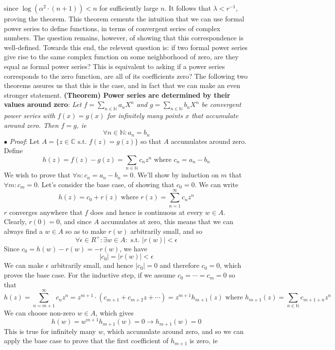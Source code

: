\documentclass{article}
\newcommand*{\tb}{\textbf}
\newcommand*{\ti}{\textit}
\newcommand*{\nn}{\newline \newline}
\newcommand*{\Pf}{\indent \ensuremath{\bullet} \textit{Proof}: }
\newcommand*{\N}{\mathbb{N}}
\newcommand*{\C}{\mathbb{C}}
\newcommand*{\st}{\text{ s.t. }}
\begin{document}
since $ \log(\alpha^2 \cdot (n + 1)) < n $ for sufficiently large $ n $. It follows that $ \lambda < r^{-1} $, proving the theorem. \qedsymbol
\nn
This theorem cements the intuition that we can use formal power series to define functions, in terms of convergent series of complex numbers. The question remains, however, of showing that this correspondence is well-defined. Towards this end, the relevent question is: if two formal power series give rise to the same complex function on some neighborhood of zero, are they equal as formal power series? This is equivalent to asking if a power series corresponds to the zero function, are all of its coefficients zero? The following two theorems assures us that this is the case, and in fact that we can make an even stronger statement.
\nn
\tb{(Theorem) Power series are determined by their values around zero}: \ti{Let $ f = \sum_{n \in \N} a_n X^n $ and $ g = \sum_{n \in \N} b_n X^n $ be convergent power series with $ f(x) = g(x) $ for infinitely many points $ x $ that accumulate around zero. Then $ f = g $, ie}
    $$ \forall n \in \N: a_n = b_n $$
\Pf Let $ A = \{ z \in \C \st f(z) = g(z) \} $ so that $ A $ accumulates around zero. Define
    $$ h(z) = f(z) - g(z) = \sum_{n \in \N} c_n z^n \text{ where } c_n = a_n - b_n $$
We wish to prove that $ \forall n: c_n = a_n - b_n = 0 $. We'll show by induction on $ m $ that $ \forall m: c_m = 0 $. Let's consider the base case, of showing that $ c_0 = 0 $. We can write
    $$ h(z) = c_0 + r(z) \text{ where } r(z) = \sum_{n = 1}^\infty c_n z^n $$
$ r $ converges anywhere that $ f $ does and hence is continuous at every $ w \in A $. Clearly, $ r(0) = 0 $, and since $ A $ accumulates at zero, this means that we can always find a $ w \in A $ so as to make $ r(w) $ arbitrarily small, and so
    $$ \forall \epsilon \in R^+: \exists w \in A: \st | r(w) | < \epsilon $$
Since $ c_0 = h(w) - r(w) = - r(w) $, we have
    $$ | c_0 | = | r(w) | < \epsilon $$
We can make $ \epsilon $ arbitrarily small, and hence $ | c_0 | = 0 $ and therefore $ c_0 = 0 $, which proves the base case. For the inductive step, if we assume $ c_0 = \cdots = c_m = 0 $ so that
    $$ h(z) = \sum_{n = m + 1}^\infty c_n z^n = z^{m + 1} \cdot (c_{m + 1} + c_{m + 2} z + \cdots) = z^{m + 1} h_{m + 1}(z) \text{ where } h_{m + 1}(z) = \sum_{n \in \N} c_{m + 1 + n} z^n $$
We can choose non-zero $ w \in A $, which gives
    $$ h(w) = w^{m + 1} h_{m + 1}(w) = 0 \rightarrow h_{m + 1}(w) = 0 $$
This is true for infinitely many $ w $, which accumulate around zero, and so we can apply the base case to prove that the first coefficient of $ h_{m + 1} $ is zero, ie
\end{document}
